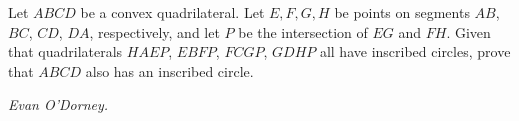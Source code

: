 Let $ABCD$ be a convex quadrilateral. Let $E,F,G,H$ be points on segments $AB$, $BC$, $CD$, $DA$, respectively, and let $P$ be the intersection of $EG$ and $FH$. Given that quadrilaterals $HAEP$, $EBFP$, $FCGP$, $GDHP$ all have inscribed circles, prove that $ABCD$ also has an inscribed circle.

\textit{Evan O'Dorney.}